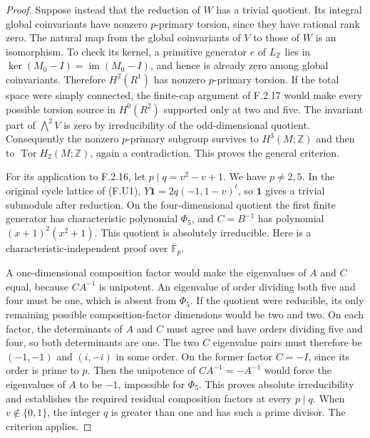 \begin{proof}
Suppose instead that the reduction of $W$ has a trivial
quotient.  Its integral global coinvariants have nonzero
$p$-primary torsion, since they have rational rank zero.
The natural map from the global coinvariants of $V$ to
those of $W$ is an isomorphism.  To check its kernel, a
primitive generator $e$ of $L_\mathbb Z$ lies in
$\ker(M_0-I)=\operatorname{im}(M_0-I)$, and hence is already
zero among global coinvariants.  Therefore $H^2(R^1)$ has
nonzero $p$-primary torsion.  If the total space were simply
connected, the finite-cap argument of F.2.17 would make
every possible torsion source in $H^0(R^2)$ supported only
at two and five.  The invariant part of $\bigwedge^2V$ is
zero by irreducibility of the odd-dimensional quotient.
Consequently the nonzero $p$-primary subgroup survives to
$H^3(M;\mathbb Z)$ and then to
$\operatorname{Tor}H_2(M;\mathbb Z)$, again a contradiction.
This proves the general criterion.

For its application to F.2.16, let $p\mid q=v^2-v+1$.
We have $p\ne2,5$.  In the original cycle lattice of (F.U1),
$Y\mathbf1=2q(-1,1-v)^t$, so $\mathbf1$ gives a trivial
submodule after reduction.  On the four-dimensional quotient
the first finite generator has characteristic polynomial
$\Phi_5$, and $C=B^{-1}$ has polynomial
$(x+1)^2(x^2+1)$.  This quotient is absolutely irreducible.
Here is a characteristic-independent proof over
$\overline{\mathbb F}_p$.

A one-dimensional composition factor would make the
eigenvalues of $A$ and $C$ equal, because $CA^{-1}$ is
unipotent.  An eigenvalue of order dividing both five and
four must be one, which is absent from $\Phi_5$.
If the quotient were reducible, its only remaining possible
composition-factor dimensions would be two and two.
On each factor, the determinants of $A$ and $C$ must agree
and have orders dividing five and four, so both determinants
are one.  The two $C$ eigenvalue pairs must therefore be
$(-1,-1)$ and $(i,-i)$ in some order.  On the former
factor $C=-I$, since its order is prime to $p$.
Then the unipotence of $CA^{-1}=-A^{-1}$ would force the
eigenvalues of $A$ to be $-1$, impossible for $\Phi_5$.
This proves absolute irreducibility and establishes the
required residual composition factors at every $p\mid q$.
When $v\notin\{0,1\}$, the integer $q$ is greater than one
and has such a prime divisor.  The criterion applies.
\end{proof}
